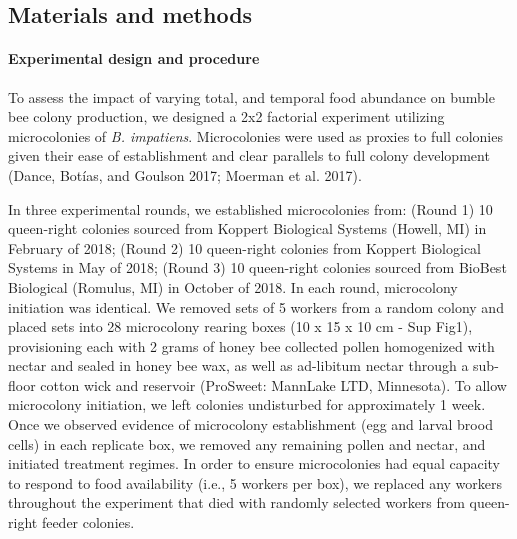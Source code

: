 \documentclass[11pt,]{article}
\let\oldparagraph\paragraph
\renewcommand{\paragraph}[1]{\oldparagraph{#1}\mbox{}}
\begin{document}
\hypertarget{materials-and-methods}{%
\subsection{Materials and methods}\label{materials-and-methods}}

\hypertarget{experimental-design-and-procedure}{%
\paragraph{Experimental design and
procedure}\label{experimental-design-and-procedure}}

To assess the impact of varying total, and temporal food abundance on
bumble bee colony production, we designed a 2x2 factorial experiment
utilizing microcolonies of \emph{B. impatiens}. Microcolonies were used
as proxies to full colonies given their ease of establishment and clear
parallels to full colony development (Dance, Botías, and Goulson 2017;
Moerman et al. 2017).

In three experimental rounds, we established microcolonies from: (Round
1) 10 queen-right colonies sourced from Koppert Biological Systems
(Howell, MI) in February of 2018; (Round 2) 10 queen-right colonies from
Koppert Biological Systems in May of 2018; (Round 3) 10 queen-right
colonies sourced from BioBest Biological (Romulus, MI) in October of
2018. In each round, microcolony initiation was identical. We removed
sets of 5 workers from a random colony and placed sets into 28
microcolony rearing boxes (10 x 15 x 10 cm - Sup Fig1), provisioning
each with 2 grams of honey bee collected pollen homogenized with nectar
and sealed in honey bee wax, as well as ad-libitum nectar through a
sub-floor cotton wick and reservoir (ProSweet: MannLake LTD, Minnesota).
To allow microcolony initiation, we left colonies undisturbed for
approximately 1 week. Once we observed evidence of microcolony
establishment (egg and larval brood cells) in each replicate box, we
removed any remaining pollen and nectar, and initiated treatment
regimes. In order to ensure microcolonies had equal capacity to respond
to food availability (i.e., 5 workers per box), we replaced any workers
throughout the experiment that died with randomly selected workers from
queen-right feeder colonies.
\end{document}
